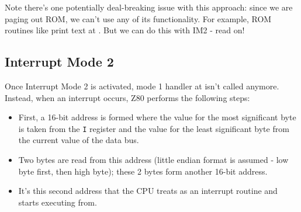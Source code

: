 Note there's one potentially deal-breaking issue with this approach: since we are paging out ROM, we can't use any of its functionality. For example, ROM routines like print text at . But we can do this with IM2 - read on!


\subsection{Interrupt Mode 2}

Once Interrupt Mode 2 is activated, mode 1 handler at  isn't called anymore. Instead, when an interrupt occurs, Z80 performs the following steps:

\begin{itemize}[topsep=1pt,itemsep=1pt]
	\item First, a 16-bit address is formed where the value for the most significant byte is taken from the {\tt I} register and the value for the least significant byte from the current value of the data bus.
	
	\item Two bytes are read from this address (little endian format is assumed - low byte first, then high byte); these 2 bytes form another 16-bit address.
	
	\item It's this second address that the CPU treats as an interrupt routine and starts executing from.
\end{itemize}

